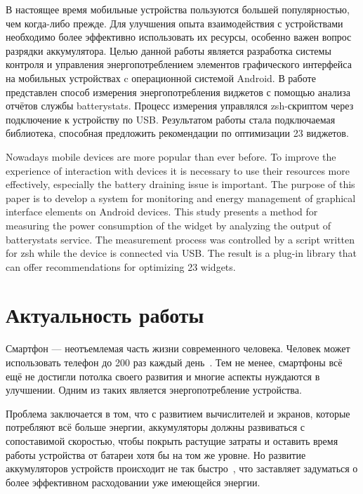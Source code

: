 \documentclass[a4paper,14pt]{extarticle} %
\begin{document}
	
	
	
	
	
	В настоящее время мобильные устройства пользуются большей популярностью, чем когда-либо прежде. Для улучшения опыта взаимодействия с устройствами необходимо более эффективно использовать их ресурсы, особенно важен вопрос разрядки аккумулятора. Целью данной работы является разработка системы контроля и управления энергопотреблением элементов графического интерфейса на мобильных устройствах c операционной системой Android. В работе представлен способ измерения энергопотребления виджетов с помощью анализа отчётов службы batterystats. Процесс измерения управлялся zsh-скриптом через подключение к устройству по USB. Результатом работы стала подключаемая библиотека, способная предложить рекомендации по оптимизации 23 виджетов.
	
	\newpage
	
	Nowadays mobile devices are more popular than ever before. To improve the experience of interaction with devices it is necessary to use their resources more effectively, especially the battery draining issue is important. The purpose of this paper is to develop a system for monitoring and energy management of graphical interface elements on Android devices. This study presents a method for measuring the power consumption of the widget by analyzing the output of batterystats service. The measurement process was controlled by a script written for zsh while the device is connected via USB. The result is a plug-in library that can offer recommendations for optimizing 23 widgets.
	
	\newpage
	\tableofcontents
	\newpage
	
	
	
	\newpage
	\section{Актуальность работы}
	
	Смартфон --- неотъемлемая часть жизни современного человека. Человек может использовать телефон до 200 раз каждый день~\parencite{falaki2010diversity}. Тем не менее, смартфоны всё ещё не достигли потолка своего развития и многие аспекты нуждаются в улучшении. Одним из таких является энергопотребление устройства.
	
	Проблема заключается в том, что с развитием вычислителей и экранов, которые потребляют всё больше энергии, аккумуляторы должны развиваться с сопоставимой скоростью, чтобы покрыть растущие затраты и оставить время работы устройства от батареи хотя бы на том же уровне. Но развитие аккумуляторов устройств происходит не так быстро~\parencite{pentikousis2010search}, что заставляет задуматься о более эффективном расходовании уже имеющейся энергии.
	
\end{document}
